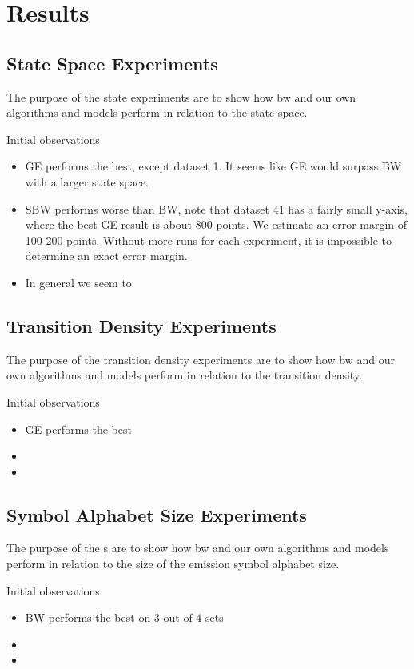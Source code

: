 \FloatBarrier

\section{Results}\label{results}

\subsection{State Space Experiments}
The purpose of the state experiments are to show how \gls{bw} and our own algorithms and models perform in relation to the state space.
	

Initial observations
\begin{itemize}
\item GE performs the best, except dataset 1. It seems like GE would surpass BW with a larger state space.
\item SBW performs worse than BW, note that dataset 41 has a fairly small y-axis, where the best GE result is about 800 points. We estimate an error margin of 100-200 points. Without more runs for each experiment, it is impossible to determine an exact error margin.
\item In general we seem to 
\end{itemize}


\subsection{Transition Density Experiments}
The purpose of the transition density experiments are to show how \gls{bw} and our own algorithms and models perform in relation to the transition density.
	

Initial observations
\begin{itemize}
\item GE performs the best
\item 
\item 
\end{itemize}

\subsection{Symbol Alphabet Size Experiments}
The purpose of the s are to show how \gls{bw} and our own algorithms and models perform in relation to the size of the emission symbol alphabet size.
	
	
Initial observations
\begin{itemize}
\item BW performs the best on 3 out of 4 sets
\item 
\item 
\end{itemize}	
	

